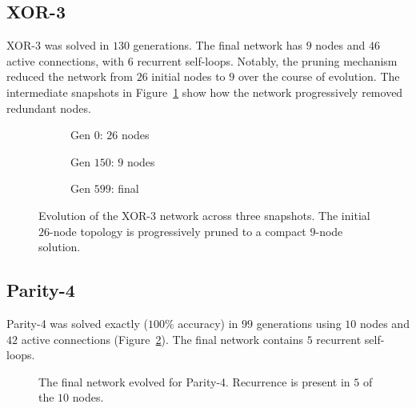 \subsection{XOR-3}
\label{sec:results-xor3}

XOR-3 was solved in $130$ generations. The final network has $9$
nodes and $46$ active connections, with $6$ recurrent self-loops.
Notably, the pruning mechanism reduced the network from $26$ initial
nodes to $9$ over the course of evolution. The intermediate snapshots
in Figure~\ref{fig:xor3-snapshots} show how the network progressively
removed redundant nodes.

\begin{figure}[h]
  \centering
  \begin{subfigure}[b]{0.32\textwidth}
    \centering
    \caption{Gen $0$: $26$ nodes}
  \end{subfigure}
  \hfill
  \begin{subfigure}[b]{0.32\textwidth}
    \centering
    \caption{Gen $150$: $9$ nodes}
  \end{subfigure}
  \hfill
  \begin{subfigure}[b]{0.32\textwidth}
    \centering
    \caption{Gen $599$: final}
  \end{subfigure}
  \caption{Evolution of the XOR-3 network across three snapshots. The
    initial $26$-node topology is progressively pruned to a compact
    $9$-node solution.}
  \label{fig:xor3-snapshots}
\end{figure}

\subsection{Parity-4}
\label{sec:results-parity4}

Parity-4 was solved exactly ($100\%$ accuracy) in $99$ generations
using $10$ nodes and $42$ active connections
(Figure~\ref{fig:parity4-spring}). The final network contains $5$
recurrent self-loops.

\begin{figure}[h]
  \centering
  \caption{The final network evolved for Parity-4. Recurrence is
    present in $5$ of the $10$ nodes.}
  \label{fig:parity4-spring}
\end{figure}

